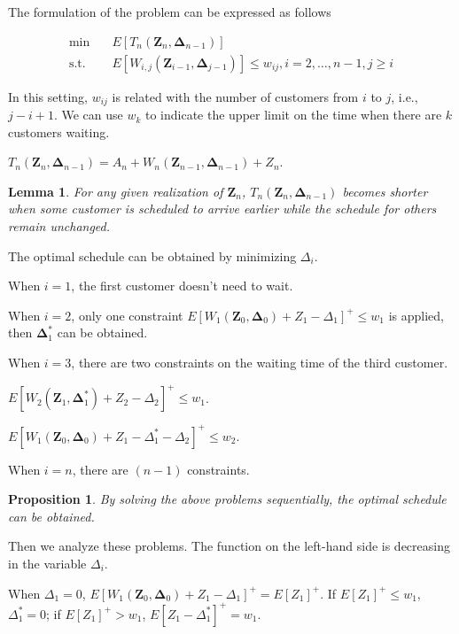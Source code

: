 \documentclass{article}
\newcommand{\Z}{\mathbf{Z}}
\newcommand{\D}{\bm{\Delta}}
\newtheorem{lemma}{\hspace{2em}Lemma}
\newtheorem{proposition}{\hspace{2em}Proposition}
\begin{document}
The formulation of the problem can be expressed as follows

\begin{equation}\label{joint_waiting}
    \begin{aligned}
        \min \quad & E \left[T_n(\Z_{n}, \D_{n-1}) \right] \\
        \mbox{s.t.} \quad & E\left[W_{i,j}(\Z_{i-1}, \D_{j-1}) \right] \leq w_{ij}, i =2, \ldots, n-1, j \geq i
    \end{aligned}
\end{equation}


In this setting, $w_{ij}$ is related with the number of customers from $i$ to $j$, i.e., $j-i +1$. We can use $w_{k}$ to indicate the upper limit on the time when there are $k$ customers waiting.

$T_{n}(\Z_{n}, \D_{n-1}) = A_{n} + W_{n}(\Z_{n-1}, \D_{n-1}) + Z_{n}$.

\begin{lemma}
For any given realization of $\Z_{n}$, $T_n(\Z_{n}, \D_{n-1})$ becomes shorter when some customer is scheduled to arrive earlier while the schedule for others remain unchanged.
\end{lemma}

The optimal schedule can be obtained by minimizing $\Delta_{i}$.

When $i =1$, the first customer doesn't need to wait.

When $i =2$, only one constraint $E\left[W_{1}(\Z_{0}, \D_{0}) + Z_{1}- \Delta_{1} \right]^{+} \leq w_{1}$ is applied, then $\D_{1}^{*}$ can be obtained.

When $i =3$, there are two constraints on the waiting time of the third customer.

$E\left[W_{2}(\Z_{1}, \D_{1}^{*}) + Z_{2} - \Delta_{2}\right]^{+} \leq w_{1}$.

$E\left[W_{1}(\Z_{0}, \D_{0}) + Z_{1} - \Delta_{1}^{*} - \Delta_{2}\right]^{+} \leq w_{2}$.

When $i =n$, there are $(n-1)$ constraints.

\begin{proposition}
    By solving the above problems sequentially, the optimal schedule can be obtained.
\end{proposition}

Then we analyze these problems. The function on the left-hand side is decreasing in the variable $\Delta_{i}$.

When $\Delta_{1} = 0$, $E\left[W_{1}(\Z_{0}, \D_{0}) + Z_{1}- \Delta_{1} \right]^{+} = E\left[Z_{1}\right]^{+}$. If $E\left[Z_{1}\right]^{+} \leq w_{1}$, $\Delta_{1}^{*} = 0$; if $E\left[Z_{1}\right]^{+} > w_{1}$, $E\left[Z_{1}- \Delta_{1}^{*} \right]^{+} = w_1$.
\end{document}
